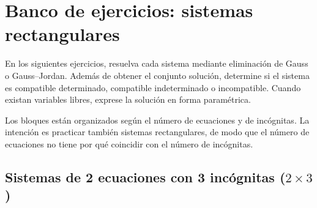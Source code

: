 \documentclass[11pt]{article}
\begin{document}
\section{Banco de ejercicios: sistemas rectangulares}
En los siguientes ejercicios, resuelva cada sistema mediante eliminación de Gauss o Gauss--Jordan. Además de obtener el conjunto solución, determine si el sistema es compatible determinado, compatible indeterminado o incompatible. Cuando existan variables libres, exprese la solución en forma paramétrica.

Los bloques están organizados según el número de ecuaciones y de incógnitas. La intención es practicar también sistemas rectangulares, de modo que el número de ecuaciones no tiene por qué coincidir con el número de incógnitas.
\subsection{Sistemas de 2 ecuaciones con 3 incógnitas ($ 2\times 3 $)}
\end{document}
